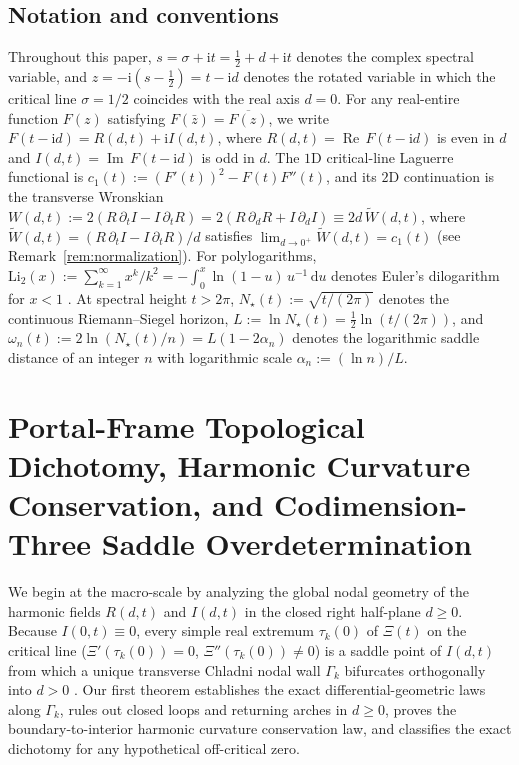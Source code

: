 \documentclass[11pt,reqno]{amsart}
\theoremstyle{definition}
\theoremstyle{remark}
\numberwithin{equation}{section}
\newcommand{\dd}{\mathrm{d}}
\newcommand{\ii}{\mathrm{i}}
\newcommand{\RePt}{\operatorname{Re}}
\newcommand{\ImPt}{\operatorname{Im}}
\newcommand{\Li}{\mathrm{Li}}
\begin{document}
\subsection{Notation and conventions}\label{subsec:notation}

Throughout this paper, $s = \sigma + \ii t = \frac{1}{2} + d + \ii t$ denotes the complex spectral variable, and $z = -\ii(s - \frac{1}{2}) = t - \ii d$ denotes the rotated variable in which the critical line $\sigma=1/2$ coincides with the real axis $d=0$. For any real-entire function $F(z)$ satisfying $F(\bar{z})=\overline{F(z)}$, we write $F(t-\ii d) = R(d,t) + \ii I(d,t)$, where $R(d,t)=\RePt\,F(t-\ii d)$ is even in $d$ and $I(d,t)=\ImPt\,F(t-\ii d)$ is odd in $d$. The $1$D critical-line Laguerre functional is $c_1(t) := (F'(t))^2 - F(t)F''(t)$, and its $2$D continuation is the transverse Wronskian $W(d,t) := 2(R\,\partial_t I - I\,\partial_t R) = 2(R\,\partial_d R + I\,\partial_d I) \equiv 2d\,\widetilde{W}(d,t)$, where $\widetilde{W}(d,t) = (R\,\partial_t I - I\,\partial_t R)/d$ satisfies $\lim_{d\to 0^+}\widetilde{W}(d,t) = c_1(t)$ (see Remark~\ref{rem:normalization}). For polylogarithms, $\Li_2(x) := \sum_{k=1}^\infty x^k/k^2 = -\int_0^x \ln(1-u)\,u^{-1}\,\dd u$ denotes Euler's dilogarithm for $x < 1$ \cite{Lewin1981}. At spectral height $t > 2\pi$, $N_\star(t) := \sqrt{t/(2\pi)}$ denotes the continuous Riemann--Siegel horizon, $L := \ln N_\star(t) = \frac{1}{2}\ln(t/(2\pi))$, and $\omega_n(t) := 2\ln(N_\star(t)/n) = L(1 - 2\alpha_n)$ denotes the logarithmic saddle distance of an integer $n$ with logarithmic scale $\alpha_n := (\ln n)/L$.

\section{Portal-Frame Topological Dichotomy, Harmonic Curvature Conservation, and Codimension-Three Saddle Overdetermination}\label{sec:macro}

We begin at the macro-scale by analyzing the global nodal geometry of the harmonic fields $R(d,t)$ and $I(d,t)$ in the closed right half-plane $d \ge 0$. Because $I(0,t) \equiv 0$, every simple real extremum $\tau_k(0)$ of $\Xi(t)$ on the critical line ($\Xi'(\tau_k(0))=0$, $\Xi''(\tau_k(0))\ne 0$) is a saddle point of $I(d,t)$ from which a unique transverse Chladni nodal wall $\Gamma_k$ bifurcates orthogonally into $d > 0$ \cite{Missiaen2026P2,Missiaen2026P8}. Our first theorem establishes the exact differential-geometric laws along $\Gamma_k$, rules out closed loops and returning arches in $d \ge 0$, proves the boundary-to-interior harmonic curvature conservation law, and classifies the exact dichotomy for any hypothetical off-critical zero.
\end{document}
